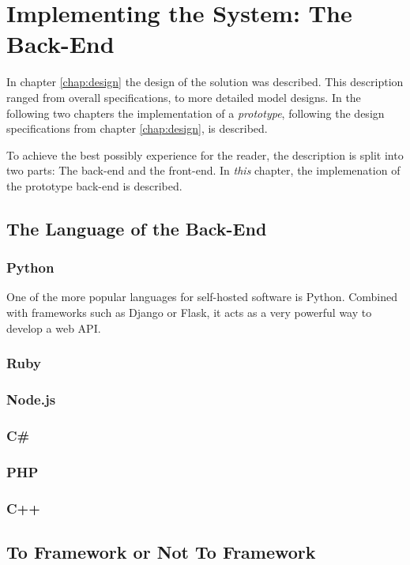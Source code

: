 \chapter{Implementing the System: The Back-End}
	In chapter \ref{chap:design} the design of the solution was described. This description ranged from overall specifications, to more detailed model designs. In the following two chapters the implementation of a \emph{prototype}, following the design specifications from chapter \ref{chap:design}, is described.

	To achieve the best possibly experience for the reader, the description is split into two parts: The back-end and the front-end. In \emph{this} chapter, the implemenation of the prototype back-end is described.


	\section{The Language of the Back-End}
		\subsection{Python}
			One of the more popular languages for self-hosted software is Python. Combined with frameworks such as Django or Flask, it acts as a very powerful way to develop a web API.




		\subsection{Ruby}
		\subsection{Node.js}
		\subsection{C\#}
		\subsection{PHP}
		\subsection{C++}

	\section{To Framework or Not To Framework}
